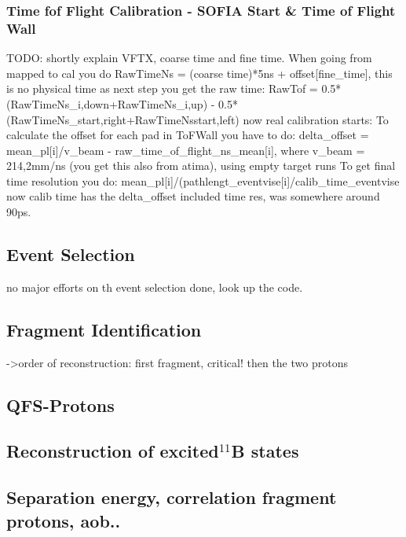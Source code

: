 \subsubsection{Time fof Flight Calibration -  SOFIA Start \& Time of Flight Wall}
TODO: shortly explain VFTX, coarse time and fine time. \newline
When going from mapped to cal you do RawTimeNs =  (coarse time)*5ns + offset[fine_time], this is no physical time\newline
as next step you get the raw time:\newline
RawTof = 0.5*(RawTimeNs_{i,down}+RawTimeNs_{i,up}) - 0.5*(RawTimeNs_{start,right}+RawTimeNs{start,left})\newline
now real calibration starts:\newline
To calculate the offset for each pad in ToFWall you have to do:\newline
delta_offset = mean_pl[i]/v_beam  - raw_time_of_flight_ns_mean[i], where v_beam = 214,2mm/ns (you get this also from atima), using empty target runs
To get final time resolution you do:
mean_pl[i]/(pathlengt_eventvise[i]/calib_time_eventvise  now calib time has the delta_offset included
time res, was somewhere around 90ps.




\subsection{Event Selection}
no major efforts on th event selection done, look up the code.
\subsection{Fragment Identification}
->order of reconstruction: first fragment, critical! then the two protons

\subsection{QFS-Protons}

\subsection{Reconstruction of excited$ ^{11}$B states}

\subsection{Separation energy, correlation fragment protons, aob..}
